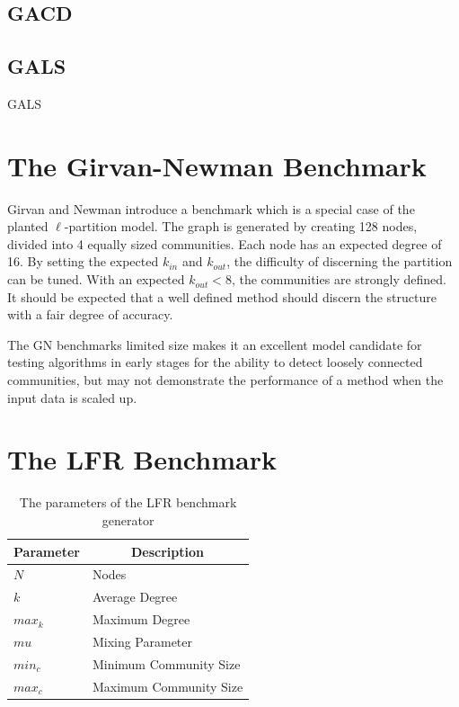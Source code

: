 \subsection{GACD}
\cite{Shi2009}



\subsection{GALS}
GALS\cite{liu2013genetic}


\section{The Girvan-Newman Benchmark}

Girvan and Newman introduce a benchmark which is a special case of the planted $\ell$-partition model\cite{Girvan2002}. The graph is generated by creating 128 nodes, divided into 4 equally sized communities. Each node has an expected degree of 16. By setting the expected $k_{in}$ and $k_{out}$, the difficulty of discerning the partition can be tuned. With an expected $k_{out} < 8$, the communities are strongly defined. It should be expected that a well defined method should discern the structure with a fair degree of accuracy. 

The GN benchmarks limited size makes it an excellent model candidate for testing algorithms in early stages for the ability to detect loosely connected communities, but may not demonstrate the performance of a method when the input data is scaled up\cite{Yang2016}.


\section{The LFR Benchmark}



\begin{table}[h!]
	\centering
	\begin{tabular}{ |l | l| } 
		\hline
		\multicolumn{1}{|c|}{\textbf{Parameter}} & \multicolumn{1}{|c|}{\textbf{Description}} \\
		\hline
		\hline
		$N$ & Nodes \\ 
		\hline
		$k$ & Average Degree \\ 
		\hline
		$max_k$ & Maximum Degree \\ 
		\hline	
		$mu$ & Mixing Parameter \\ 
		\hline
		$min_c$ & Minimum Community Size \\
		\hline
		$max_c$ & Maximum Community Size \\ 
		\hline
	\end{tabular}
		\caption{The parameters of the LFR benchmark generator}
		\label{table:lfrparams}
\end{table}

